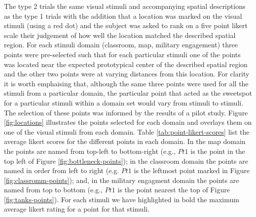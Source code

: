 \documentclass[11pt,letterpaper]{article}
\begin{document}
The type 2 trials the same visual stimuli and accompanying spatial descriptions as the type 1 trials with the addition that a location was marked on the visual stimuli (using a red dot) and the subject was asked to rank on a five point likert scale their judgement of how well the location matched the described spatial region. For each stimuli domain (classroom, map, military engagement) three points were pre-selected such that for each particular stimuli one of the points was located near the expected prototypical center of the described spatial region and the other two points were at varying distances from this location. For clarity it is worth emphaising that, although the same three points were used for all the stimuli from a particular domain, the particular point that acted as the sweetspot for a particular stimuli within a domain set would vary from stimuli to stimuli. The selection of these points was informed by the results of a pilot study. Figure \ref{fig:locations} illustrates the points selected for each domain and overlays them on one of the visual stimuli from each domain. Table \ref{tab:point-likert-scores} list the average likert scores for the different points in each domain. In the map domain the points are named from top-left to bottom-right (e.g., $Pt1$ is the point in the top left of Figure \ref{fig:bottleneck-points}); in the classroom domain the points are named in order from left to right (e.g. $Pt1$ is the leftmost point marked in Figure \ref{fig:classromm-points}); and, in the military engagment domain the points are named from top to bottom (e.g., $Pt1$ is the point nearest the top of Figure \ref{fig:tanks-points}). For each stimuli we have highlighted in bold the maximum average likert rating for a point for that stimuli.
\end{document}
